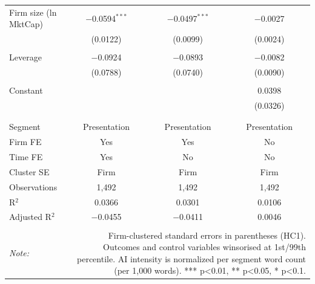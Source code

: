 \begin{table}[!htbp]
\begin{tabular}{@{\extracolsep{5pt}}lccc}
 Firm size (ln MktCap) & $-$0.0594$^{***}$ & $-$0.0497$^{***}$ & $-$0.0027 \\ 
  & (0.0122) & (0.0099) & (0.0024) \\ 
  & & & \\ 
 Leverage & $-$0.0924 & $-$0.0893 & $-$0.0082 \\ 
  & (0.0788) & (0.0740) & (0.0090) \\ 
  & & & \\ 
 Constant &  &  & 0.0398 \\ 
  &  &  & (0.0326) \\ 
  & & & \\ 
\hline \\[-1.8ex] 
Segment & Presentation & Presentation & Presentation \\ 
Firm FE & Yes & Yes & No \\ 
Time FE & Yes & No & No \\ 
Cluster SE & Firm & Firm & Firm \\ 
Observations & 1,492 & 1,492 & 1,492 \\ 
R$^{2}$ & 0.0366 & 0.0301 & 0.0106 \\ 
Adjusted R$^{2}$ & $-$0.0455 & $-$0.0411 & 0.0046 \\ 
\hline 
\hline \\[-1.8ex] 
\textit{Note:}  & \multicolumn{3}{r}{Firm-clustered standard errors in parentheses (HC1). Outcomes and control variables winsorised at 1st/99th percentile. AI intensity is normalized per segment word count (per 1,000 words). *** p<0.01, ** p<0.05, * p<0.1.} \\ 
\end{tabular} 
\end{table} 
